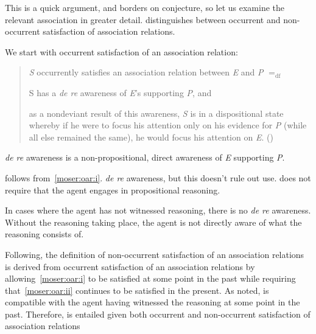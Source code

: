 \begin{note}
  This is a quick argument, and borders on conjecture, so let us examine the relevant association in greater detail.
  \citeauthor{Moser:1989tv} distinguishes between occurrent and non-occurrent satisfaction of association relations.

  We start with occurrent satisfaction of an association relation:
  \begin{quote}
    \emph{S} occurrently satisfies an association relation between \emph{E} and \emph{P} \(=_{\text{df}}\)
    \begin{enumerate*}[label=(\roman*), ref=(\roman*)]
    \item\label{moser:oar:i} S has a \emph{de re} awareness of \emph{E}'s supporting \emph{P}, and
    \item\label{moser:oar:ii} as a nondeviant result of this awareness, \emph{S} is in a dispositional state whereby if he were to focus his attention only on his evidence for \emph{P} (while all else remained the same), he would focus his attention on \emph{E}.\newline
    \mbox{}\hfill\mbox{(\citeyear[141--142]{Moser:1989tv})}
    \end{enumerate*}
  \end{quote}

  \emph{de re} awareness is a non-propositional, direct awareness of \emph{E} supporting \emph{P}.

  \ESU{} follows from~\ref{moser:oar:i}.
  \emph{de re} awareness, but this doesn't rule out use.
  \ESU{} does not require that the agent engages in propositional reasoning.

  In cases where the agent has not witnessed reasoning, there is no \emph{de re} awareness.
  Without the reasoning taking place, the agent is not directly aware of what the reasoning consists of.

  Following, the definition of non-occurrent satisfaction of an association relations is derived from occurrent satisfaction of an association relations by allowing~\ref{moser:oar:i} to be satisfied at some point in the past while requiring that~\ref{moser:oar:ii} continues to be satisfied in the present.
  As noted, \ESU{} is compatible with the agent having witnessed the reasoning at some point in the past.
  Therefore, \ESU{} is entailed given both occurrent and non-occurrent satisfaction of association relations
\end{note}

